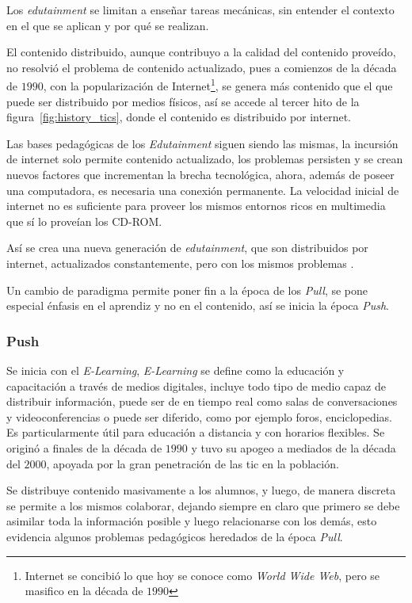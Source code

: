 Los \emph{edutainment} se limitan a enseñar tareas mecánicas, sin entender el
contexto en el que se aplican y por qué se realizan\cite{egenfeldt2007third}.

El contenido distribuido, aunque contribuyo a la calidad del contenido proveído,
no resolvió el problema de contenido actualizado, pues a comienzos de la década
de $1990$, con la popularización de Internet\footnote{Internet se concibió lo
    que hoy se conoce como \emph{World Wide Web}\cite{white:ict}, pero se
    masifico en la década de $1990$\cite{leinonen:ict}}, se genera más contenido
que el que puede ser distribuido por medios físicos, así se accede al tercer
hito de la figura~\ref{fig:history_tics}, donde el contenido es distribuido por
internet.

Las bases pedagógicas de los \emph{Edutainment} siguen siendo las mismas, la
incursión de internet solo permite contenido actualizado, los problemas
persisten y se crean nuevos factores que incrementan la brecha tecnológica,
ahora, además de poseer una computadora, es necesaria una conexión permanente.
La velocidad inicial de internet no es suficiente para proveer los mismos
entornos ricos en multimedia que sí lo proveían los CD-ROM\cite{leinonen:ict}.

Así se crea una nueva generación de \emph{edutainment}, que son distribuidos por
internet, actualizados constantemente, pero con los mismos problemas
\cite{leinonen:ict}.

Un cambio de paradigma permite poner fin a la época de los \emph{Pull}, se pone
especial énfasis en el aprendiz y no en el contenido, así se inicia la época
\emph{Push}.

\subsubsection{Push}

Se inicia con el \emph{E-Learning}, \emph{E-Learning} se define como la
educación y capacitación a través de medios digitales, incluye todo tipo de
medio capaz de distribuir información, puede ser de en tiempo real como
salas de conversaciones y videoconferencias o puede ser diferido, como por
ejemplo foros, enciclopedias. Es particularmente útil para educación a distancia
y con horarios flexibles. Se originó a finales de la década de $1990$ y tuvo su
apogeo a mediados de la década del $2000$, apoyada por la gran penetración de
las \Gls{tic} en la población\cite{punie:ict}.

Se distribuye contenido masivamente a los alumnos, y luego, de manera discreta
se permite a los mismos colaborar, dejando siempre en claro que primero se debe
asimilar toda la información posible y luego relacionarse con los
demás\cite{leinonen:ict}, esto evidencia algunos problemas pedagógicos heredados
de la época \emph{Pull}.


